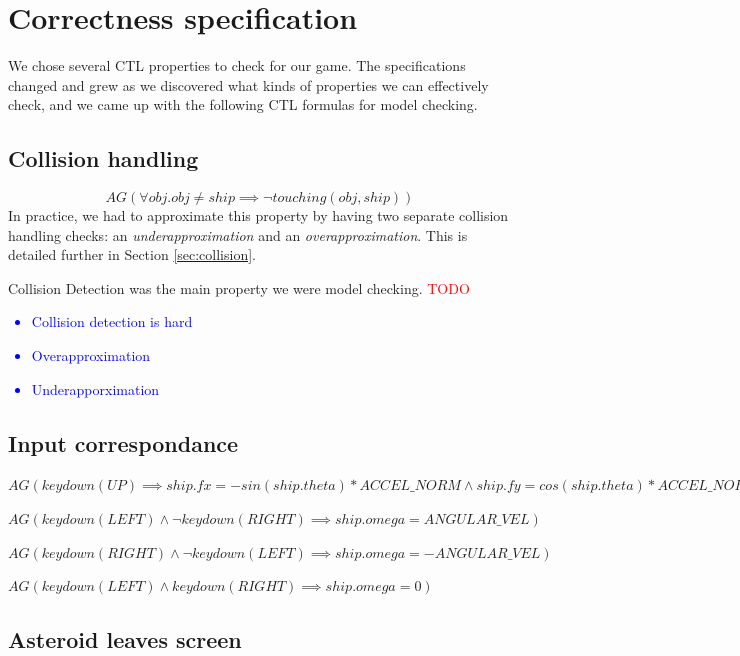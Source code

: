 \documentclass{article}
\begin{document}
\section{Correctness specification}
\label{sec:properties}

    We chose several CTL properties to check for our game. The specifications
    changed and grew as we discovered what kinds of properties we can
    effectively check, and we came up with the following CTL formulas for model
    checking.

    \subsection{Collision handling}

        $$AG(\forall obj. obj \neq ship \implies \lnot touching(obj,ship))$$
        In practice, we had to approximate this property by having two separate
        collision handling checks: an \emph{underapproximation} and an
        \emph{overapproximation}. This is detailed further in Section
        \ref{sec:collision}.

        Collision Detection was the main property we were model checking.
        \textcolor{red}{
            TODO
        }
        \textcolor{blue}{
            \begin{itemize}
                \item Collision detection is hard
                \item Overapproximation
                \item Underapporximation
            \end{itemize}
        }

    \subsection{Input correspondance}

        $AG(keydown(UP) \implies ship.fx = -sin(ship.theta) * ACCEL\_NORM
                        \land ship.fy = cos(ship.theta) * ACCEL\_NORM)$

        $AG(keydown(LEFT) \land \lnot keydown(RIGHT) \implies ship.omega = ANGULAR\_VEL)$

        $AG(keydown(RIGHT) \land \lnot keydown(LEFT) \implies ship.omega = -ANGULAR\_VEL)$

        $AG(keydown(LEFT) \land keydown(RIGHT) \implies ship.omega = 0)$

	\subsection{Asteroid leaves screen}
\end{document}
